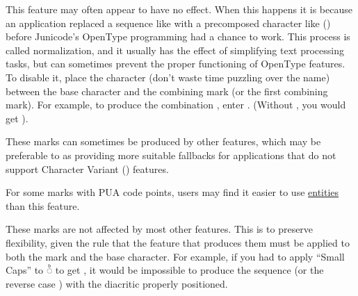 This feature may often appear to have no effect. When this happens it is because
an application replaced a sequence like  with a precomposed character
like  () before Junicode's OpenType programming had a chance to work.
This process is called normalization, and it usually has the effect of simplifying
text processing tasks, but can sometimes prevent the proper functioning of OpenType
features. To disable it, place the character   (don't waste time puzzling over the name) between the base
character and the combining mark (or the first combining mark). For example, to produce
the combination , enter .
(Without , you would get ).

These marks can sometimes be produced by other  features, which may be preferable to
 as providing more suitable fallbacks for applications that do not support Character Variant
() features.

For some marks with PUA code points, users may find it easier to use \hyperlink{ss10}{entities} than this feature.

These marks are not affected by most other features. This is to preserve flexibility, given the rule that the feature
that produces them must be applied to both the mark and the base character. For example, if you had to
apply  ``Small Caps'' to  ◌͏ᷨ to get
 , it would be impossible to produce the sequence
(or the reverse case )
with the diacritic properly positioned.

